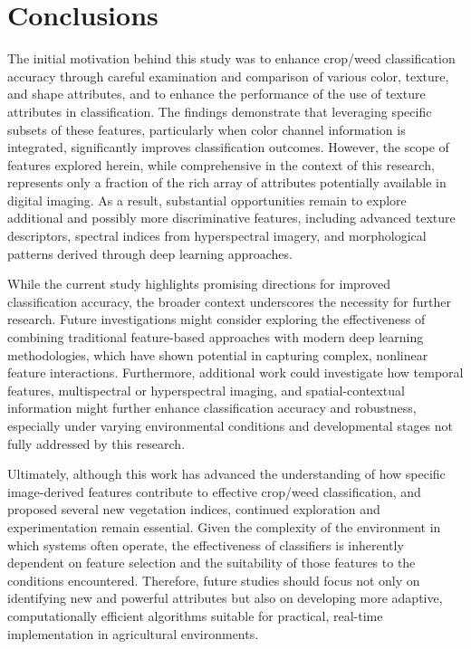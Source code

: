 \documentclass[letterpaper, notitlepage]{report}
\begin{document}
\section{Conclusions}
The initial motivation behind this study was to enhance crop/weed classification accuracy through careful examination and comparison of various color, texture, and shape attributes, and to enhance the performance of the use of texture attributes in classification. The findings demonstrate that leveraging specific subsets of these features, particularly when color channel information is integrated, significantly improves classification outcomes. However, the scope of features explored herein, while comprehensive in the context of this research, represents only a fraction of the rich array of attributes potentially available in digital imaging. As a result, substantial opportunities remain to explore additional and possibly more discriminative features, including advanced texture descriptors, spectral indices from hyperspectral imagery, and morphological patterns derived through deep learning approaches.

While the current study highlights promising directions for improved classification accuracy, the broader context underscores the necessity for further research. Future investigations might consider exploring the effectiveness of combining traditional feature-based approaches with modern deep learning methodologies, which have shown potential in capturing complex, nonlinear feature interactions. Furthermore, additional work could investigate how temporal features, multispectral or hyperspectral imaging, and spatial-contextual information might further enhance classification accuracy and robustness, especially under varying environmental conditions and developmental stages not fully addressed by this research.

Ultimately, although this work has advanced the understanding of how specific image-derived features contribute to effective crop/weed classification, and proposed several new vegetation indices, continued exploration and experimentation remain essential. Given the complexity of the environment in which systems often operate, the effectiveness of classifiers is inherently dependent on feature selection and the suitability of those features to the conditions encountered. Therefore, future studies should focus not only on identifying new and powerful attributes but also on developing more adaptive, computationally efficient algorithms suitable for practical, real-time implementation in agricultural environments.
\end{document}
